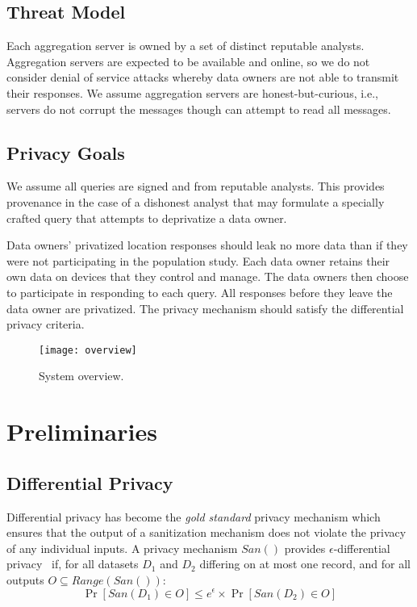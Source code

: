 \documentclass[conference]{IEEEtran}
\begin{document}
\subsection{Threat Model}

Each aggregation server is owned by a set of distinct reputable analysts. Aggregation servers are expected to be available and online, so we do not consider denial of service attacks whereby data owners are not able to transmit their responses. We assume aggregation servers are honest-but-curious, i.e., servers do not corrupt the messages though can attempt to read all messages.

\subsection{Privacy Goals}

We assume all queries are signed and from reputable analysts. This provides provenance in the case of a dishonest analyst that may formulate a specially crafted query that attempts to deprivatize a data owner.

Data owners' privatized location responses should leak no more data than if they were not participating in the population study. Each data owner retains their own data on devices that they control and manage. The data owners then choose to participate in responding to each query. All responses before they leave the data owner are privatized. The privacy mechanism should satisfy the differential privacy criteria. 


\begin{figure}[t!]
\centering
\texttt{[image: overview]}
\caption{System overview.}
\label{fig:systemoverview}
\end{figure}
 \section{Preliminaries}

\subsection{Differential Privacy}

Differential privacy has become the \emph{gold standard} privacy mechanism which ensures that the output of a sanitization mechanism does not violate the privacy of any individual inputs.  A privacy mechanism $San()$ provides $\epsilon$-differential privacy~\cite{DBLP:conf/icalp/Dwork06,DBLP:conf/tcc/DworkMNS06} if, for all datasets $D_1$ and $D_2$ differing on at most one record, and for all outputs $O \subseteq Range(San())$:
\begin{equation}
\Pr[San(D_1) \in O] \leq e^{\epsilon} \times \Pr[San(D_2) \in O]
\label{eqn:dp}
\end{equation}
\end{document}
